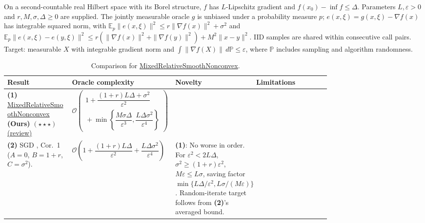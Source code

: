 \begin{table}[tp]
\centering
\caption{Comparison for \href{https://github.com/k3nfalt/longtails/blob/main/LongTails/Setups/MixedRelativeSmoothNonconvex.lean}{MixedRelativeSmoothNonconvex}.}\label{tab:MixedRelativeSmoothNonconvex}
\parbox{\linewidth}{\footnotesize On a second-countable real Hilbert space with its Borel structure, $f$ has $L$-Lipschitz gradient and $f(x_0)-\inf f\le\Delta$. Parameters $L,\varepsilon>0$ and $r,M,\sigma,\Delta\ge0$ are supplied. The jointly measurable oracle $g$ is unbiased under a probability measure $p$; $e(x,\xi)=g(x,\xi)-\nabla f(x)$ has integrable squared norm, with
$\mathbb E_p\|e(x,\xi)\|^2\le r\|\nabla f(x)\|^2+\sigma^2$ and
$\mathbb E_p\|e(x,\xi)-e(y,\xi)\|^2\le r(\|\nabla f(x)\|^2+\|\nabla f(y)\|^2)+M^2\|x-y\|^2$.
IID samples are shared within consecutive call pairs. Target: measurable $X$ with integrable gradient norm and $\int\|\nabla f(X)\|\,d\mathbb P\le\varepsilon$, where $\mathbb P$ includes sampling and algorithm randomness.}\par\smallskip
\begin{threeparttable}
\footnotesize
\setlength{\tabcolsep}{4pt}\renewcommand{\arraystretch}{1.25}
\begin{tabularx}{\linewidth}{@{}>{\raggedright\arraybackslash}p{0.20\linewidth}>{\raggedright\arraybackslash}p{0.32\linewidth}>{\raggedright\arraybackslash}p{0.25\linewidth}>{\raggedright\arraybackslash}X@{}}
\toprule
\textbf{Result} & \textbf{Oracle complexity} & \textbf{Novelty} & \textbf{Limitations} \\
\midrule
\textbf{(1)} \href{https://github.com/k3nfalt/longtails/blob/main/LongTails/Theorems/MixedRelativeSmoothNonconvex.lean}{Mixed\allowbreak Relative\allowbreak Smooth\allowbreak Nonconvex} \textbf{(Ours)} $(\star\star\star)$ \href{https://github.com/k3nfalt/longtails/blob/main/scripts/reviews/MixedRelativeSmoothNonconvex.md}{(review)} &
$\mathcal{O}\!\left(\begin{gathered}1+\dfrac{(1+r)L\Delta+\sigma^2}{\varepsilon^2}\\ {}+\min\!\left\{\dfrac{M\sigma\Delta}{\varepsilon^3},\dfrac{L\Delta\sigma^2}{\varepsilon^4}\right\}\end{gathered}\right)$ & & \\
\midrule[1.2pt]
\textbf{(2)} SGD \citep{ESNKhaled2020v3}, Cor.~1 ($A=0$, $B=1+r$, $C=\sigma^2$). &
$\mathcal{O}\!\left(1+\dfrac{(1+r)L\Delta}{\varepsilon^2}+\dfrac{L\Delta\sigma^2}{\varepsilon^4}\right)$ &
\textbf{(1)}: No worse in order. For $\varepsilon^2<2L\Delta$, $\sigma^2\ge(1+r)\varepsilon^2$, $M\varepsilon\le L\sigma$, saving factor $\min\{L\Delta/\varepsilon^2,L\sigma/(M\varepsilon)\}$. Random-iterate target follows from \textbf{(2)}'s averaged bound. &

\end{tabularx}
\end{threeparttable}
\end{table}
